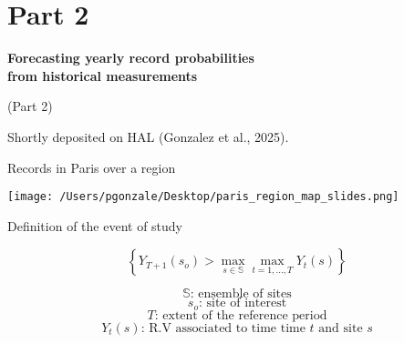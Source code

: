 \documentclass[9pt,compress]{beamer}
\begin{document}
\section{Part 2}
{
\begin{frame}
\begin{center}
\textbf{\LARGE {\color{beamer@blendedblue} Forecasting yearly record probabilities \\
from historical measurements}}
 \bigskip
 \bigskip

\LARGE {\color{beamer@blendedblue} (Part 2)}
\end{center}
 \bigskip
 \bigskip
 \bigskip
 \bigskip
 
{\tiny
\begin{myboxred}
Shortly deposited on HAL (Gonzalez et al., 2025).
\end{myboxred}
}


\end{frame}
}
%
%
%
\begin{frame}{Records in Paris over a region}
\begin{center}
\texttt{[image: /Users/pgonzale/Desktop/paris\_region\_map\_slides.png]}
 \end{center}    
\end{frame}
%
%
%
\begin{frame}{Definition of the event of study}   
\begin{tcolorbox}[title= Local records over a given region ]
$$
 \left\{  Y_{T+1}(s_o)  > \max_{s \in \mathbb{S}} \max_{t=1, \dots, T} Y_t(s)\right\}
$$
\end{tcolorbox}
\pause
\begin{tcolorbox}[title= Notation ]
$$\mathbb{S} \text{: ensemble of sites}$$
$$s_o \text{: site of interest}$$
$$T \text{: extent of the reference period}$$
$$Y_t(s) \text{: R.V associated to time time } t \text{ and site } s$$ 
\end{tcolorbox}
\end{frame}
%
%
%
\end{document}
